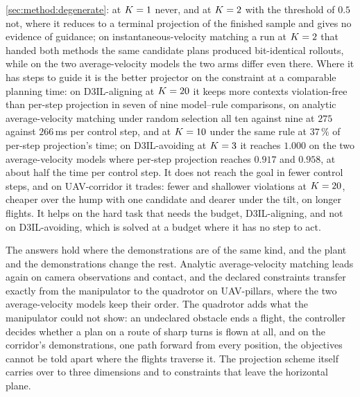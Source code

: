 \begin{description}
    \autoref{sec:method:degenerate}: at $K = 1$ never, and at $K = 2$ with the threshold of
    $0.5$ not, where it reduces to a terminal projection of the finished sample and gives no evidence
    of guidance; on instantaneous-velocity matching a run at $K = 2$ that handed both methods the
    same candidate plans produced bit-identical rollouts, while on the two average-velocity models the
    two arms differ even there. Where it has steps to guide it is the better projector on the
    constraint at a comparable planning time: on D3IL-aligning at $K = 20$ it keeps more contexts
    violation-free than per-step projection in seven of nine model--rule comparisons, on analytic
    average-velocity matching under random selection all ten against nine at $275$ against
    $266$\,ms per control step, and at $K = 10$ under the same rule at $37\,\%$ of per-step
    projection's time; on D3IL-avoiding at $K = 3$ it reaches $1.000$ on the two average-velocity
    models where per-step projection reaches $0.917$ and $0.958$, at about half the time per control
    step. It does not reach the goal in fewer control steps, and on UAV-corridor it trades: fewer and
    shallower violations at $K = 20$, cheaper over the hump with one candidate and dearer under
    the tilt, on longer flights. It helps on the hard task that needs the budget, D3IL-aligning, and
    not on D3IL-avoiding, which is solved at a budget where it has no step to act.
  \item[RQ3 --- Transfer.] The answers hold where the demonstrations are of the same kind, and the
    plant and the demonstrations change the rest. Analytic average-velocity matching leads again on
    camera observations and contact, and the declared constraints transfer exactly from the
    manipulator to the quadrotor on UAV-pillars, where the two average-velocity models keep their
    order. The quadrotor adds what the manipulator could not show: an undeclared obstacle ends a
    flight, the controller decides whether a plan on a route of sharp turns is flown at all, and on
    the corridor's demonstrations, one path forward from every position, the objectives cannot be
    told apart where the flights traverse it. The projection scheme itself carries over to three
    dimensions and to constraints that leave
    the horizontal plane.
\end{description}
